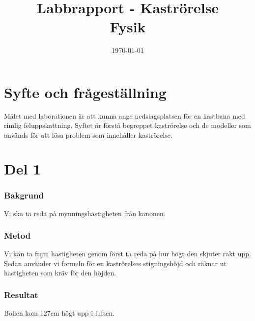 \documentclass[11p]{article}
\title{Labbrapport - Kaströrelse \\ \small Fysik}
\author{\name}
\date{\today}
\begin{document}
    \maketitle


    \section{Syfte och frågeställning}
    Målet med laborationen är att kunna ange nedslagsplatsen för en kastbana med rimlig
    feluppskattning.
    Syftet är förstå begreppet kaströrelse och de modeller som används för att lösa
    problem som innehåller kaströrelse.
    \section{Del 1}
        \subsubsection{Bakgrund}
            Vi ska ta reda på mynningshastigheten från kanonen.

        \subsubsection{Metod}
            Vi kan ta fram hastigheten genom först ta reda på hur högt
            den skjuter rakt upp.
            Sedan använder vi formeln för en kaströrelses stigningshöjd
            och räknar ut hastigheten som kräv för den höjden.

        \subsubsection{Resultat}
            Bollen kom 127cm högt upp i luften.
\end{document}
